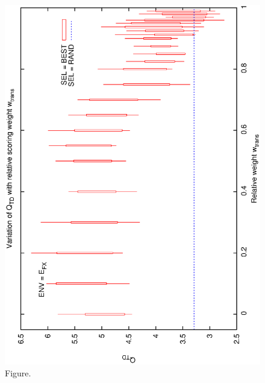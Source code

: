 \documentclass[12pt,a4paper]{article}
\begin{document}
\begin{figure}[htbp]
 \begin{center}
  \includegraphics[scale=1.0, angle=0]{figures/cs1_dw2_td.eps}
 \end{center}
  \caption[Figure.]
{Figure.}
\end{figure}
\clearpage
\end{document}
